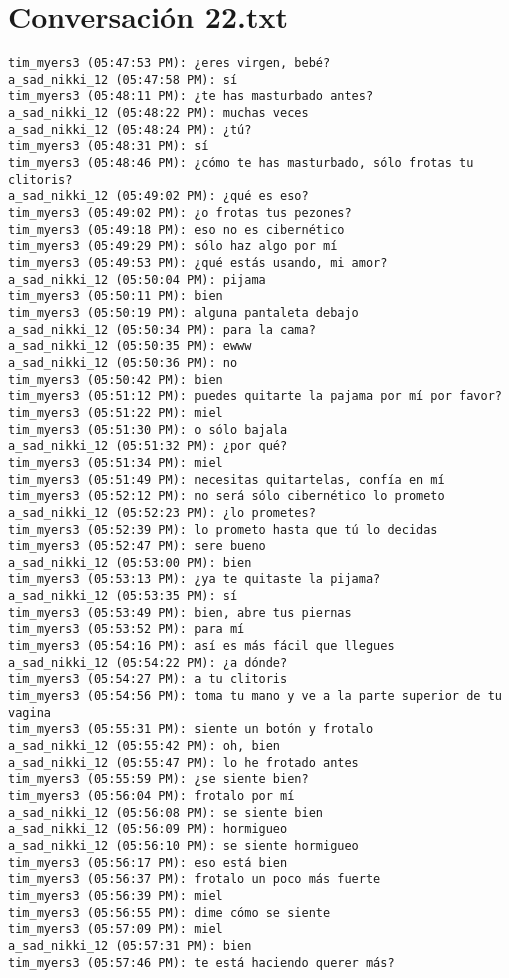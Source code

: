 \section{Conversaci\'on 22.txt}

\begin{verbatim}
tim_myers3 (05:47:53 PM): ¿eres virgen, bebé? 
a_sad_nikki_12 (05:47:58 PM): sí
tim_myers3 (05:48:11 PM): ¿te has masturbado antes?
a_sad_nikki_12 (05:48:22 PM): muchas veces
a_sad_nikki_12 (05:48:24 PM): ¿tú?
tim_myers3 (05:48:31 PM): sí
tim_myers3 (05:48:46 PM): ¿cómo te has masturbado, sólo frotas tu clitoris?
a_sad_nikki_12 (05:49:02 PM): ¿qué es eso?
tim_myers3 (05:49:02 PM): ¿o frotas tus pezones?
tim_myers3 (05:49:18 PM): eso no es cibernético 
tim_myers3 (05:49:29 PM): sólo haz algo por mí
tim_myers3 (05:49:53 PM): ¿qué estás usando, mi amor?
a_sad_nikki_12 (05:50:04 PM): pijama
tim_myers3 (05:50:11 PM): bien
tim_myers3 (05:50:19 PM): alguna pantaleta debajo
a_sad_nikki_12 (05:50:34 PM): para la cama?
a_sad_nikki_12 (05:50:35 PM): ewww
a_sad_nikki_12 (05:50:36 PM): no
tim_myers3 (05:50:42 PM): bien
tim_myers3 (05:51:12 PM): puedes quitarte la pajama por mí por favor?
tim_myers3 (05:51:22 PM): miel
tim_myers3 (05:51:30 PM): o sólo bajala
a_sad_nikki_12 (05:51:32 PM): ¿por qué?
tim_myers3 (05:51:34 PM): miel 
tim_myers3 (05:51:49 PM): necesitas quitartelas, confía en mí
tim_myers3 (05:52:12 PM): no será sólo cibernético lo prometo
a_sad_nikki_12 (05:52:23 PM): ¿lo prometes?
tim_myers3 (05:52:39 PM): lo prometo hasta que tú lo decidas
tim_myers3 (05:52:47 PM): sere bueno
a_sad_nikki_12 (05:53:00 PM): bien
tim_myers3 (05:53:13 PM): ¿ya te quitaste la pijama?
a_sad_nikki_12 (05:53:35 PM): sí
tim_myers3 (05:53:49 PM): bien, abre tus piernas
tim_myers3 (05:53:52 PM): para mí
tim_myers3 (05:54:16 PM): así es más fácil que llegues 
a_sad_nikki_12 (05:54:22 PM): ¿a dónde?
tim_myers3 (05:54:27 PM): a tu clitoris
tim_myers3 (05:54:56 PM): toma tu mano y ve a la parte superior de tu vagina
tim_myers3 (05:55:31 PM): siente un botón y frotalo
a_sad_nikki_12 (05:55:42 PM): oh, bien
a_sad_nikki_12 (05:55:47 PM): lo he frotado antes
tim_myers3 (05:55:59 PM): ¿se siente bien?
tim_myers3 (05:56:04 PM): frotalo por mí
a_sad_nikki_12 (05:56:08 PM): se siente bien
a_sad_nikki_12 (05:56:09 PM): hormigueo
a_sad_nikki_12 (05:56:10 PM): se siente hormigueo
tim_myers3 (05:56:17 PM): eso está bien
tim_myers3 (05:56:37 PM): frotalo un poco más fuerte
tim_myers3 (05:56:39 PM): miel
tim_myers3 (05:56:55 PM): dime cómo se siente
tim_myers3 (05:57:09 PM): miel
a_sad_nikki_12 (05:57:31 PM): bien 
tim_myers3 (05:57:46 PM): te está haciendo querer más?


\end{verbatim}

